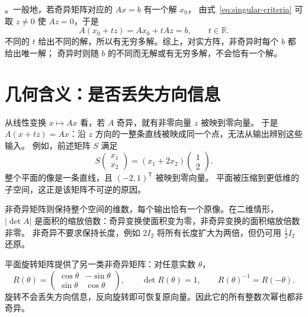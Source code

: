 \documentclass[UTF8,12pt,a4paper,fontset=fandol]{ctexart}
\begin{document}
。一般地，若奇异矩阵对应的 $Ax=b$ 有一个解 $x_0$，
由式~\eqref{eq:singular-criteria} 可取 $z\ne0$ 使 $Az=0$，于是
\[
  A(x_0+tz)=Ax_0+tAz=b,\qquad t\in\mathbb R.
\]
不同的 $t$ 给出不同的解，所以有无穷多解。综上，对实方阵，非奇异时每个 $b$ 都给出唯一解；
奇异时则随 $b$ 的不同而无解或有无穷多解，不会恰有一个解。

\section{几何含义：是否丢失方向信息}

从线性变换 $x\mapsto Ax$ 看，若 $A$ 奇异，就有非零向量 $z$ 被映到零向量。
于是 $A(x+tz)=Ax$：沿 $z$ 方向的一整条直线被映成同一个点，无法从输出辨别这些输入。
例如，前述矩阵 $S$ 满足
\[
  S\begin{pmatrix}x_1\\x_2\end{pmatrix}
  =(x_1+2x_2)\begin{pmatrix}1\\2\end{pmatrix}.
\]
整个平面的像是一条直线，且 $(-2,1)^{\mathsf T}$ 被映到零向量。
平面被压缩到更低维的子空间，这正是该矩阵不可逆的原因。

非奇异矩阵则保持整个空间的维数，每个输出恰有一个原像。在二维情形，
$|\det A|$ 是面积的缩放倍数：奇异变换使面积变为零，非奇异变换的面积缩放倍数非零。
非奇异不要求保持长度，例如 $2I_2$ 将所有长度扩大为两倍，但仍可用 $\tfrac12 I_2$ 还原。

平面旋转矩阵提供了另一类非奇异矩阵：对任意实数 $\theta$，
\[
  R(\theta)=\begin{pmatrix}\cos\theta&-\sin\theta\\\sin\theta&\cos\theta\end{pmatrix},
  \qquad \det R(\theta)=1,\qquad R(\theta)^{-1}=R(-\theta).
\]
旋转不会丢失方向信息，反向旋转即可恢复原向量。因此它的所有整数次幂也都非奇异。
\end{document}
